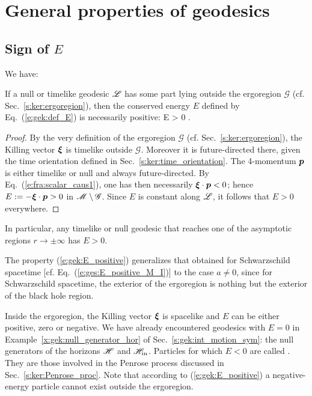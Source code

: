 \section{General properties of geodesics}

\subsection{Sign of $E$}

We have:
\begin{greybox}
If a null or timelike geodesic $\mathscr{L}$ has some part lying outside the ergoregion $\mathscr{G}$ (cf. Sec.~\ref{s:ker:ergoregion}),
then the conserved energy $E$ defined by Eq.~(\ref{e:gek:def_E}) is necessarily positive:
\be \label{e:gek:E_positive}
    \Li \not\subset {}\quad \Longrightarrow \quad E > 0 .
\ee
\end{greybox}
\begin{proof}
By the very definition of the ergoregion $\mathscr{G}$ (cf. Sec.~\ref{s:ker:ergoregion}),
the Killing vector $\bm{\xi}$ is timelike outside $\mathscr{G}$. Moreover it is
future-directed there, given the time orientation defined in Sec.~\ref{s:ker:time_orientation}.
The 4-momentum $\bm{p}$ is either timelike or null and always future-directed.
By Eq.~(\ref{e:fra:scalar_caus1}), one has then necessarily $\bm{\xi}\cdot\bm{p} < 0$; hence
$E := - \bm{\xi}\cdot\bm{p} > 0$ in $\mathscr{M}\setminus \mathscr{G}$. Since $E$ is constant along $\mathscr{L}$, it
follows that $E > 0$ everywhere.
\end{proof}
In particular, any timelike or null geodesic that reaches one of the asymptotic regions
$r\to\pm\infty$ has $E>0$.
\begin{remark}
The property (\ref{e:gek:E_positive}) generalizes that obtained for Schwarzschild spacetime [cf. Eq.~(\ref{e:ges:E_positive_M_I})] to
the case $a\not=0$, since for Schwarzschild spacetime, the exterior of the ergoregion
is nothing but the exterior of the black hole region.
\end{remark}

Inside the ergoregion, the Killing vector $\bm{\xi}$ is spacelike and $E$ can be
either positive, zero or negative.
We have already encountered geodesics with $E=0$ in Example~\ref{x:gek:null_generator_hor} of Sec.~\ref{s:gek:int_motion_sym}: the null generators of the horizons $\mathscr{H}$
and $\mathscr{H}_{\rm in}$.
Particles for which $E<0$ are called
. They are those involved in the Penrose process discussed in Sec.~\ref{s:ker:Penrose_proc}.
Note that according to (\ref{e:gek:E_positive}) a negative-energy particle cannot exist
outside the ergoregion.

